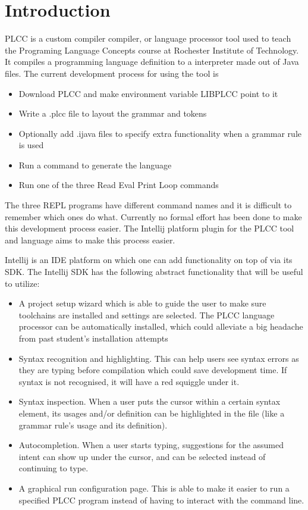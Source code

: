 \documentclass[conference, letterpaper]{IEEEtran}
\begin{document}
\section{Introduction}\label{sec:introduction}
PLCC\cite{plcc-paper} is a custom compiler compiler, or language processor tool used to teach the Programing Language Concepts course at Rochester Institute of Technology.
It compiles a programming language definition to a interpreter made out of Java files.
The current development process for using the tool is
\begin{itemize}
    \item Download PLCC and make environment variable LIBPLCC point to it
    \item Write a .plcc file to layout the grammar and tokens
    \item Optionally add .ijava files to specify extra functionality when a grammar rule is used
    \item Run a command to generate the language
    \item Run one of the three Read Eval Print Loop commands
\end{itemize}
The three REPL programs have different command names and it is difficult to remember which ones do what.
Currently no formal effort has been done to make this development process easier.
The Intellij platform plugin for the PLCC tool and language aims to make this process easier.
\par Intellij is an IDE platform on which one can add functionality on top of via its SDK\@.
The Intellij SDK has the following abstract functionality that will be useful to utilize:
\begin{itemize}
    \item A project setup wizard which is able to guide the user to make sure toolchains are installed and settings are selected.
    The PLCC language processor can be automatically installed, which could alleviate a big headache from past student's installation attempts
    \item Syntax recognition and highlighting.
    This can help users see syntax errors as they are typing before compilation which could save development time.
    If syntax is not recognised, it will have a red squiggle under it.
    \item Syntax inspection.
    When a user puts the cursor within a certain syntax element, its usages and/or definition can be highlighted in the file (like a grammar rule's usage and its definition).
    \item Autocompletion.
    When a user starts typing, suggestions for the assumed intent can show up under the cursor, and can be selected instead of continuing to type.
    \item A graphical run configuration page.
    This is able to make it easier to run a specified PLCC program instead of having to interact with the command line.
\end{itemize}
\end{document}
